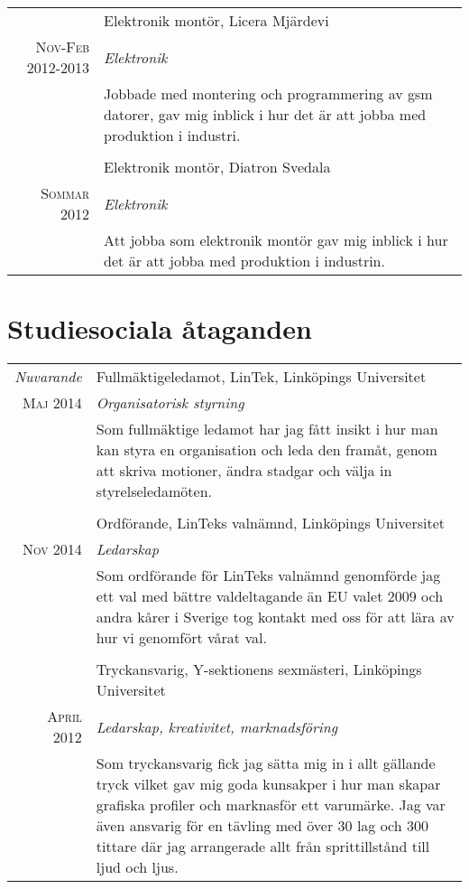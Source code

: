 \documentclass[a4paper,10pt]{article}
\begin{document}
\begin{tabular}{r|p{11cm}}
    & Elektronik montör, Licera Mjärdevi \\         
    \textsc{Nov-Feb 2012-2013} & \emph{Elektronik}\\
    & \footnotesize{Jobbade med montering och programmering av gsm datorer, gav mig inblick i hur det är att jobba med produktion i industri.}\\\multicolumn{2}{c}{} \\
    
    & Elektronik montör, Diatron Svedala \\         
    \textsc{Sommar 2012} & \emph{Elektronik}\\
    & \footnotesize{Att jobba som elektronik montör gav mig inblick i hur det är att jobba med produktion i industrin.}\\
    
    
\end{tabular}

\section{Studiesociala åtaganden}
\begin{tabular}{r|p{11cm}}

    \emph{Nuvarande} &  Fullmäktigeledamot, LinTek, Linköpings Universitet\\
    \textsc{Maj 2014} & \emph{Organisatorisk styrning}\\
    &\footnotesize{Som fullmäktige ledamot har jag fått insikt i hur man kan styra en organisation och leda den framåt, genom att skriva motioner, ändra stadgar och välja in styrelseledamöten. }\\\multicolumn{2}{c}{} \\
    
    &  Ordförande,  LinTeks valnämnd, Linköpings Universitet\\
    \textsc{Nov 2014} & \emph{Ledarskap}\\
    &\footnotesize{Som ordförande för LinTeks valnämnd genomförde jag ett val med bättre valdeltagande än EU valet 2009 och andra kårer i Sverige tog kontakt med oss för att lära av hur vi genomfört vårat val. }\\\multicolumn{2}{c}{} \\
    
    &  Tryckansvarig, Y-sektionens sexmästeri, Linköpings Universitet\\
    \textsc{April 2012} & \emph{Ledarskap, kreativitet, marknadsföring}\\
    &\footnotesize{Som tryckansvarig fick jag sätta mig in i allt gällande tryck vilket gav mig goda kunsakper i hur man skapar grafiska profiler och marknasför ett varumärke. Jag var även ansvarig för en tävling med över 30 lag och 300 tittare där jag arrangerade allt från sprittillstånd till ljud och ljus.  }\\
\end{tabular}
\end{document}
